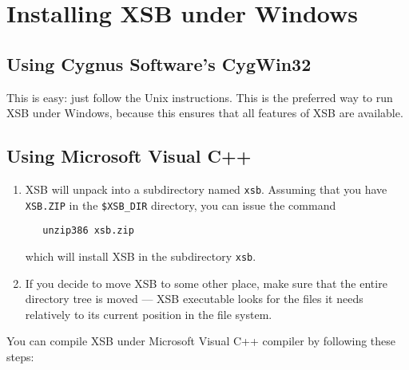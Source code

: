 \section{Installing XSB under Windows}
\subsection{Using Cygnus Software's \mbox{CygWin32}}
\label{quick:cygwin}

This is easy: just follow the Unix instructions. This is the preferred way to
run XSB under Windows, because this ensures that all features of XSB are
available.


\subsection{Using Microsoft Visual C++}
\label{quick:DOS}

\begin{enumerate}
\item 
   XSB will unpack into a subdirectory named {\tt xsb}.
   Assuming that you have {\tt XSB.ZIP} in the {\tt \$XSB\_DIR} directory,
   you can issue the command
\begin{verbatim}
   unzip386 xsb.zip
\end{verbatim}
   which will install XSB in the subdirectory {\tt xsb}.

 \item If you decide to move XSB to some other place, make sure that the
   entire directory tree is moved --- XSB executable looks for the files it
   needs relatively to its current position in the file system.

\end{enumerate}


You can compile XSB under Microsoft Visual C++ compiler 
by following these steps:

